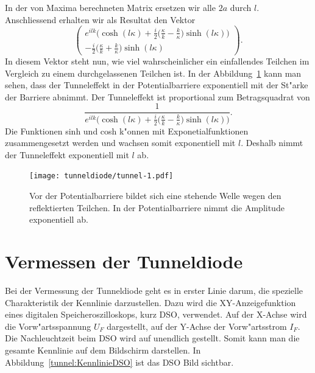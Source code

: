 \begin{refsection}
In der von Maxima berechneten Matrix ersetzen wir alle $2a$ durch $l$. 
Anschliessend erhalten wir als Resultat den Vektor
\[
\begin{pmatrix}
\displaystyle
e^{ilk}\biggl(\cosh(l\kappa)
+\frac{i}{2}\biggl(\frac{\kappa}{k}-\frac{k}{\kappa}\biggr)\sinh(l\kappa)
\biggr)
\\
\displaystyle
- \frac{i}{2}
\biggl(\frac{\kappa}{k}+\frac{k}{\kappa}\biggr)
\sinh(l\kappa)
\end{pmatrix}.
\]
In diesem Vektor steht nun, wie viel wahrscheinlicher ein einfallendes Teilchen im Vergleich zu einem durchgelassenen Teilchen ist.
In der Abbildung~\ref{tunnel:Tunneleffekt} kann man sehen, dass der Tunneleffekt in der Potentialbarriere exponentiell mit der St"arke der Barriere abnimmt.
Der Tunneleffekt ist proportional zum Betragsquadrat von
\[
\frac{1}{\displaystyle
e^{ilk}\biggl(\cosh(l\kappa)
+\frac{i}{2}\biggl(\frac{\kappa}{k}-\frac{k}{\kappa}\biggr)\sinh(l\kappa)
\biggr)}.
\]
Die Funktionen sinh und cosh k"onnen mit Exponetialfunktionen zusammengesetzt werden und wachsen somit exponentiell mit $l$.
Deshalb nimmt der Tunneleffekt exponentiell mit $l$ ab.

\begin{figure}	%
\centering
\texttt{[image: tunneldiode/tunnel-1.pdf]}
\caption{Vor der Potentialbarriere bildet sich eine stehende Welle wegen den reflektierten Teilchen. In der Potentialbarriere nimmt die Amplitude exponentiell ab.
\label{tunnel:Tunneleffekt}}
\end{figure}

\section{Vermessen der Tunneldiode}

Bei der Vermessung der Tunneldiode geht es in erster Linie darum, die spezielle Charakteristik der Kennlinie darzustellen. 
Dazu wird die XY-Anzeigefunktion eines digitalen Speicheroszilloskops, kurz DSO, verwendet. 
Auf der X-Achse wird die Vorw"artsspannung $U_F$ dargestellt, auf der Y-Achse der Vorw"artsstrom $I_F$. 
Die Nachleuchtzeit beim DSO wird auf unendlich gestellt. 
Somit kann man die gesamte Kennlinie auf dem Bildschirm darstellen. 
In Abbildung~\ref{tunnel:KennlinieDSO} ist das DSO Bild sichtbar.


\end{refsection}
